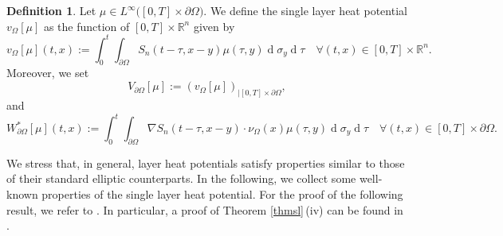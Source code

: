\documentclass[11pt,reqno,a4paper]{amsart}
\theoremstyle{plain}
\theoremstyle{definition}
\newtheorem{definition}[theorem]{Definition}
\renewcommand{\d}[1]{\ensuremath{\operatorname{d}\!{#1}}}
\begin{document}
\begin{definition}\label{def single double potential}
    Let $\mu \in L^\infty\big([0,T] \times \partial\Omega\big)$. We define the single layer heat potential $v_{\Omega}[\mu]$ as the function of $[0,T]\times \mathbb{R}^n$ given by
    \begin{equation*} 
    v_{\Omega} [\mu](t,x) := \int_{0}^{t} \int_{\partial \Omega} S_n(t-\tau,x-y) \mu(\tau, y) \d \sigma_y \d \tau \quad \forall(t,x) \in [0, T] \times \mathbb{R}^n.
    \end{equation*}
    Moreover, we set 
    \begin{equation*}
        V_{\partial\Omega} [\mu] := \left( v_{\Omega} [\mu] \right)_{|[0,T]\times \partial\Omega},
    \end{equation*}
    and
    \begin{equation*}
    W^\ast_{\partial\Omega} [\mu](t,x) := \int_{0}^{t} \int_{\partial \Omega} \nabla S_n(t-\tau,x-y) \cdot \nu_\Omega(x) \mu(\tau, y) \d \sigma_y \d \tau \quad \forall(t,x) \in [0, T] \times \partial\Omega.
    \end{equation*}
\end{definition}

We stress that, in general, layer heat potentials satisfy properties similar to those of their standard elliptic counterparts. 
In the following, we collect some well-known properties of the single layer heat potential. For the proof of the following result, we refer to \cite{DaLu23,LaSoUr68,LaLu17,LaLu19}. In particular, a proof of Theorem \ref{thmsl}\,(iv) can be found in \cite{Mo24}.
\end{document}
